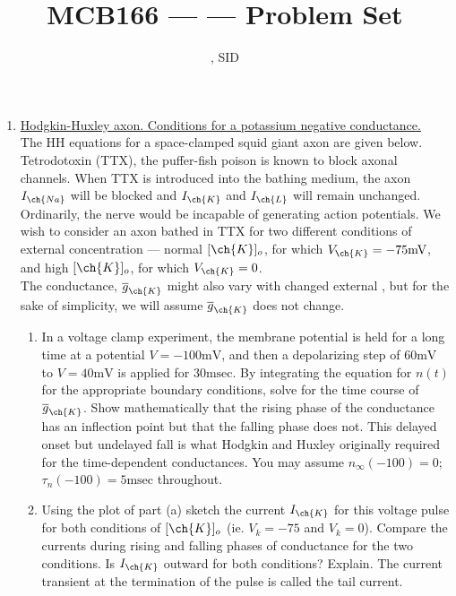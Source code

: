 \documentclass[11pt]{article}
\title{MCB166 --- \Session --- Problem Set \Homework}
\author{\Name, SID \SID}
\date{\displaydate{date}}
\begin{document}
\maketitle

\newpage
\begin{enumerate}[label=\arabic*.]
\item
\underline{Hodgkin-Huxley axon. Conditions for a potassium negative conductance.}
\\
The HH equations for a space-clamped squid giant axon are given below. Tetrodotoxin (TTX), the puffer-fish poison is known to block axonal  channels. When TTX is introduced into the bathing medium, the axon $I_{\ch{Na}}$ will be blocked and $I_{\ch{K}}$ and $I_{\ch{L}}$ will remain unchanged. Ordinarily, the nerve would be incapable of generating action potentials. We wish to consider an axon bathed in TTX for two different conditions of external  concentration --- normal $[\ch{K}]_o$, for which $V_{\ch{K}} = -75 \text{mV}$, and high $[\ch{K}]_o$, for which $V_{\ch{K}} = 0$.
\\
The conductance, $\overline{g}_{\ch{K}}$ might also vary with changed external , but for the sake of simplicity, we will assume $\overline{g}_{\ch{K}}$ does not change.
\begin{enumerate}[label=(\alph*)]
\item
In a voltage clamp experiment, the membrane potential is held for a long time at a potential $V = -100 \text{mV}$, and then a depolarizing step of $60 \text{mV}$ to $V = 40 \text{mV}$ is applied for $30 \text{msec}$. By integrating the equation for $n(t)$ for the appropriate boundary conditions, solve for the time course of $\overline{g}_{\ch{K}}$. Show mathematically that the rising phase of the conductance has an inflection point but that the falling phase does not. This delayed onset but undelayed fall is what Hodgkin and Huxley originally required for the time-dependent conductances. You may assume $n_{\infty}(-100) = 0$; $\tau_n(-100) = 5 \text{msec}$ throughout.











\item
Using the plot of part (a) sketch the current $I_{\ch{K}}$ for this voltage pulse for both conditions of $[\ch{K}]_o$ (ie. $V_k = -75$ and $V_k = 0$). Compare the currents during rising and falling phases of conductance for the two conditions. Is $I_{\ch{K}}$ outward for both conditions? Explain. The current transient at the termination of the pulse is called the tail current.

















\end{enumerate}
\end{enumerate}
\end{document}
